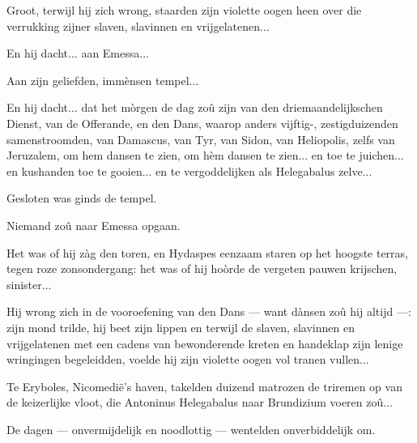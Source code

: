 \documentclass[a4paper, 12pt, oneside, dutch]{article}
\begin{document}
Groot, terwijl hij zich wrong, staarden zijn violette oogen heen over die verrukking zijner slaven, slavinnen en vrijgelatenen...

En hij dacht... aan Emessa...

Aan zijn geliefden, immènsen tempel...

En hij dacht... dat het mòrgen de dag zoû zijn van den driemaandelijkschen Dienst, van de Offerande, en den Dans, waarop anders vijftig-, zestigduizenden samenstroomden, van Damascus, van Tyr, van Sidon, van Heliopolis, zelfs van Jeruzalem, om hem dansen te zien, om hèm dansen te zien... en toe te juichen... en kushanden toe te gooien... en te vergoddelijken als Helegabalus zelve...

Gesloten was ginds de tempel.

Niemand zoû naar Emessa opgaan.

Het was of hij zàg den toren, en Hydaspes eenzaam staren op het hoogste terras, tegen roze zonsondergang: het was of hij hoòrde de vergeten pauwen krijschen, sinister...

Hij wrong zich in de vooroefening van den Dans --- want dànsen zoû hij altijd ---: zijn mond trilde, hij beet zijn lippen en terwijl de slaven, slavinnen en vrijgelatenen met een cadens van bewonderende kreten en handeklap zijn lenige wringingen begeleidden, voelde hij zijn violette oogen vol tranen vullen...

Te Eryboles, Nicomedië's haven, takelden duizend matrozen de triremen op van de keizerlijke vloot, die Antoninus Helegabalus naar Brundizium voeren zoû...

De dagen --- onvermijdelijk en noodlottig --- wentelden onverbiddelijk om.

\subsection{}
\end{document}
